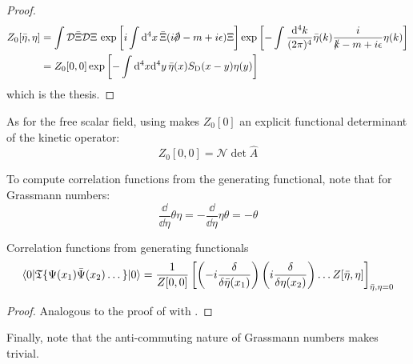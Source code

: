 \begin{proofbox}
\begin{proof}
\begin{equation*}
      \begin{split}
        Z_0[\bar{\eta},\eta]
        & = \int \mathcal{D}\bar{\Xi} \mathcal{D}\Xi\, \exp \left[ i \int \dd^4x\, \bar{\Xi} (i \slashed{\pa} - m + i\epsilon) \Xi \right] \exp \left[ - \int \frac{\dd^4k}{(2\pi)^4} \bar{\eta}(k) \frac{i}{\slashed{k} - m + i\epsilon} \eta(k) \right] \\
        & = Z_0[0,0] \exp \left[ - \int \dd^4x \dd^4y\, \bar{\eta}(x) S_\text{D}(x - y) \eta(y)  \right]
      \end{split}
    \end{equation*}
    which is the thesis.
  \end{proof}
\end{proofbox}

As for the free scalar field, using  makes $ Z_0[0] $ an explicit functional determinant of the kinetic operator:
\begin{equation}
  Z_0[0,0] = \mathcal{N} \det \hat{A}
\end{equation}

To compute correlation functions from the generating functional, note that for Grassmann numbers:
\begin{equation}
  \frac{\dd}{\dd \eta} \theta \eta = - \frac{\dd}{\dd \eta} \eta \theta = - \theta
  \label{eq:grass-ant-der}
\end{equation}

\begin{lemma}[before upper = {\tcbtitle}]{Correlation functions from generating functionals}{}
  \begin{equation}
    \braket{0 | \mathfrak{T}\{\Psi(x_1) \bar{\Psi}(x_2) \dots \} | 0} = \frac{1}{Z[0,0]} \left[ \left( -i \frac{\delta}{\delta \bar{\eta}(x_1)} \right) \left( i \frac{\delta}{\delta \eta(x_2)} \right) \dots Z[\bar{\eta},\eta] \right]_{\bar{\eta},\eta = 0}
  \end{equation}
\end{lemma}

\begin{proofbox}
  \begin{proof}
    Analogous to the proof of  with .
  \end{proof}
\end{proofbox}

Finally, note that the anti-commuting nature of Grassmann numbers makes  trivial.

